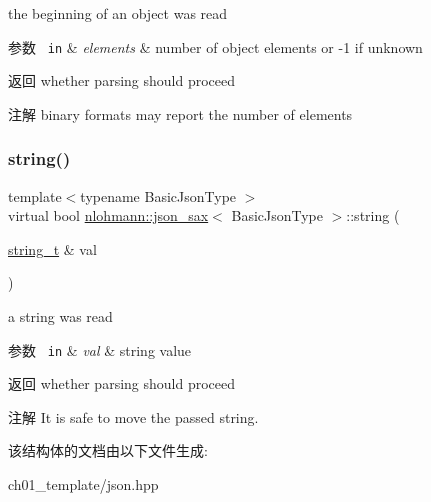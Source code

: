 the beginning of an object was read 


\begin{DoxyParams}[1]{参数}
\mbox{\texttt{ in}}  & {\em elements} & number of object elements or -\/1 if unknown \\
\hline
\end{DoxyParams}
\begin{DoxyReturn}{返回}
whether parsing should proceed 
\end{DoxyReturn}
\begin{DoxyNote}{注解}
binary formats may report the number of elements 
\end{DoxyNote}
\mbox{\label{structnlohmann_1_1json__sax_a07eab82f6c82d606787eee9ad73d2bda}} 
\subsubsection{\texorpdfstring{string()}{string()}}
{\footnotesize\ttfamily template$<$typename Basic\+Json\+Type $>$ \\
virtual bool \mbox{\hyperlink{structnlohmann_1_1json__sax}{nlohmann\+::json\+\_\+sax}}$<$ Basic\+Json\+Type $>$\+::string (\begin{DoxyParamCaption}\item[{\mbox{\hyperlink{structnlohmann_1_1json__sax_ae01977a9f3c5b3667b7a2929ed91061e}{string\+\_\+t}} \&}]{val }\end{DoxyParamCaption})\hspace{0.3cm}{\ttfamily [pure virtual]}}



a string was read 


\begin{DoxyParams}[1]{参数}
\mbox{\texttt{ in}}  & {\em val} & string value \\
\hline
\end{DoxyParams}
\begin{DoxyReturn}{返回}
whether parsing should proceed 
\end{DoxyReturn}
\begin{DoxyNote}{注解}
It is safe to move the passed string. 
\end{DoxyNote}


该结构体的文档由以下文件生成\+:\begin{DoxyCompactItemize}
\item 
ch01\+\_\+template/json.\+hpp\end{DoxyCompactItemize}
